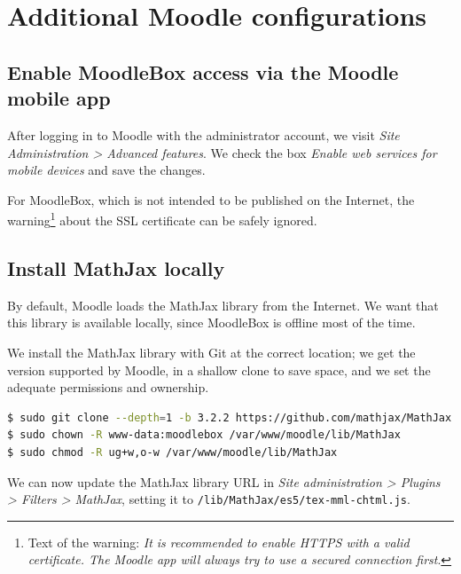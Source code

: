\documentclass[12pt]{article}
\begin{document}
\section{Additional Moodle configurations}

\subsection{Enable MoodleBox access via the Moodle mobile app}

After logging in to Moodle with the administrator account, we visit \textsl{Site Administration > Advanced features}.
We check the box \emph{Enable web services for mobile devices} and save the changes.

For MoodleBox, which is not intended to be published on the Internet, the warning\footnote{Text of the warning: \textsl{It is recommended to enable HTTPS with a valid certificate. The Moodle app will always try to use a secured connection first}.} about the SSL certificate can be safely ignored.

\subsection{Install MathJax locally}

By default, Moodle loads the MathJax library from the Internet.
We want that this library is available locally, since MoodleBox is offline most of the time.

We install the MathJax library with Git at the correct location; we get the version supported by Moodle, in a shallow clone to save space, and we set the adequate permissions and ownership.
\begin{lstlisting}[language=bash]
$ sudo git clone --depth=1 -b 3.2.2 https://github.com/mathjax/MathJax.git /var/www/moodle/lib/MathJax
$ sudo chown -R www-data:moodlebox /var/www/moodle/lib/MathJax
$ sudo chmod -R ug+w,o-w /var/www/moodle/lib/MathJax
\end{lstlisting}

We can now update the MathJax library URL in \emph{Site administration > Plugins > Filters > MathJax}, setting it to \lstinline{/lib/MathJax/es5/tex-mml-chtml.js}.
\end{document}
